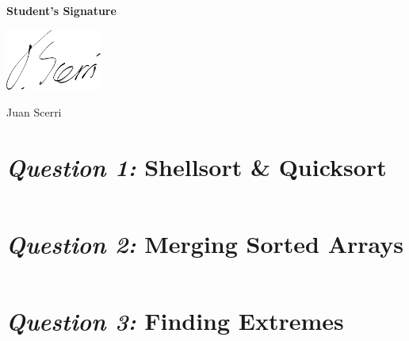 \documentclass[12pt]{article}
\begin{document}
\textbf{Student's Signature} \medskip

\underline{\includegraphics[height=2cm]{sig}} \medskip

Juan Scerri

\section{\textit{Question 1:} Shellsort \& Quicksort}





\begin{lstlisting}[caption={Screen dump for \textit{Question
1}}]
\end{lstlisting}

\section{\textit{Question 2:} Merging Sorted Arrays}





\begin{lstlisting}[caption={Screen dump for \textit{Question
2}}]
\end{lstlisting}

\section{\textit{Question 3:} Finding Extremes}





\begin{lstlisting}[caption={Screen dump for \textit{Question
3}}]
\end{lstlisting}
\end{document}
